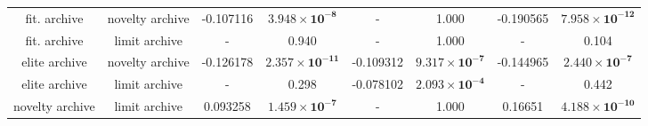 \begin{tabular}{cccccccc}
   fit. archive & novelty archive &      -0.107116 &  $\mathbf{3.948 \times 10^{-8}}$ &           - &                            1.000 &   -0.190565 & $\mathbf{7.958 \times 10^{-12}}$ \\
   fit. archive &   limit archive &              - &                            0.940 &           - &                            1.000 &           - &                            0.104 \\
  elite archive & novelty archive &      -0.126178 & $\mathbf{2.357 \times 10^{-11}}$ &   -0.109312 &  $\mathbf{9.317 \times 10^{-7}}$ &   -0.144965 &  $\mathbf{2.440 \times 10^{-7}}$ \\
  elite archive &   limit archive &              - &                            0.298 &   -0.078102 &  $\mathbf{2.093 \times 10^{-4}}$ &           - &                            0.442 \\
novelty archive &   limit archive &       0.093258 &  $\mathbf{1.459 \times 10^{-7}}$ &           - &                            1.000 &     0.16651 & $\mathbf{4.188 \times 10^{-10}}$ \\
\bottomrule
\end{tabular}
